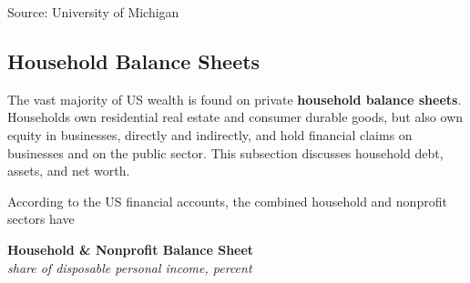 \documentclass{report}
\makeatletter
\newcommand{\tbllink}[1]{\href{https://raw.githubusercontent.com/bdecon/US-chartbook/master/chartbook/data/#1}{\faTable}}
\newcommand*\short[1]{\expandafter\@gobbletwo\number\numexpr#1\relax}
\newcommand{\absnode}[3]{\node[below right, align=left] at (axis cs: #1,#2) {#3};}
\newcommand{\shdateaxisticks}{
		date coordinates in=x, axis line style={draw=none},
		xmax={2024-01-31},
		max space between ticks=40,	    
		xtick={{1990-01-01}, {1995-01-01}, {2000-01-01}, 
			{2005-01-01}, {2010-01-01}, {2015-01-01}, {2020-01-01}},
		minor xtick={},
		enlarge y limits={0.06}, enlarge x limits={0.01},
		xticklabel style={align=center, yshift=-2pt}, tick label style={inner sep=0pt},
		}
\newcommand{\bbar}[2]{extra #1 ticks = {{#2}}, extra #1 tick labels = ,
		extra #1 tick style = {grid=major, grid style={thick, black!25}},}
\newcommand{\stdline}[4]{\addplot[very thick, no markers, color=#1] 
		table [x=#2, y=#3, col sep=comma] {#4};	}
\newcommand{\thickline}[4]{\addplot[ultra thick, no markers, color=#1] 
		table [x=#2, y=#3, col sep=comma] {#4};	}
\newcommand{\rbars}{
		\fill[color=black!10] (axis cs:{1990-07-01},\pgfkeysvalueof{/pgfplots/ymin})
			rectangle (axis cs:{1991-03-01}, \pgfkeysvalueof{/pgfplots/ymax});
		\fill[color=black!10] (axis cs:{2007-12-01},\pgfkeysvalueof{/pgfplots/ymin})
			rectangle (axis cs:{2009-07-01}, \pgfkeysvalueof{/pgfplots/ymax});
		\fill[color=black!10] (axis cs:{2001-03-01},\pgfkeysvalueof{/pgfplots/ymin})
			rectangle (axis cs:{2001-11-01}, \pgfkeysvalueof{/pgfplots/ymax});
		\fill[color=black!10] (axis cs:{2020-02-01},\pgfkeysvalueof{/pgfplots/ymin})
			rectangle (axis cs:{2020-05-01}, \pgfkeysvalueof{/pgfplots/ymax});}
\makeatother
\begin{document}
{\begin{minipage}{1.0\textwidth}
\footnotesize{Source: University of Michigan} \hfill \tbllink{umichsoc_ice.csv}
\end{minipage}
\newpage
\vspace*{-10mm} \hypertarget{hhbs}{\label{hhbs}} 

\begin{minipage}{1.0\textwidth}
\subsection*{Household Balance Sheets}
   

\small The vast majority of US wealth is found on private \textbf{household balance sheets}. Households own residential real estate and consumer durable goods, but also own equity in businesses, directly and indirectly, and hold financial claims on businesses and on the public sector. This subsection discusses household debt, assets, and net worth.

According to the US financial accounts, the combined household and nonprofit sectors have 
\end{minipage}

\begin{minipage}{0.33\textwidth}
\small 
\end{minipage} \hspace{5mm}
\begin{minipage}{0.39\textwidth}
\normalsize \textbf{Household \& Nonprofit Balance Sheet}\\
\footnotesize{\textit{share of disposable personal income, percent}}
\vspace{3.1cm}

\hspace{5mm} 


\end{minipage}}
\end{document}
